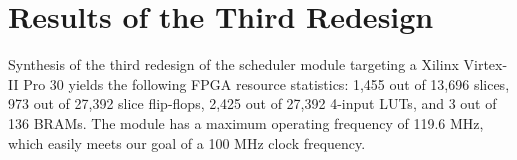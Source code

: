 \section{Results of the Third Redesign}
\label{sec:results3}

Synthesis of the third redesign of the scheduler module targeting a Xilinx
\cite{xilinx} Virtex-II Pro 30 yields the following FPGA resource statistics:
1,455 out of 13,696 slices, 973 out of 27,392 slice flip-flops, 2,425 out of
27,392 4-input LUTs, and 3 out of 136 BRAMs.  The module has a maximum
operating frequency of 119.6 MHz, which easily meets our goal of a 100 MHz
clock frequency.

